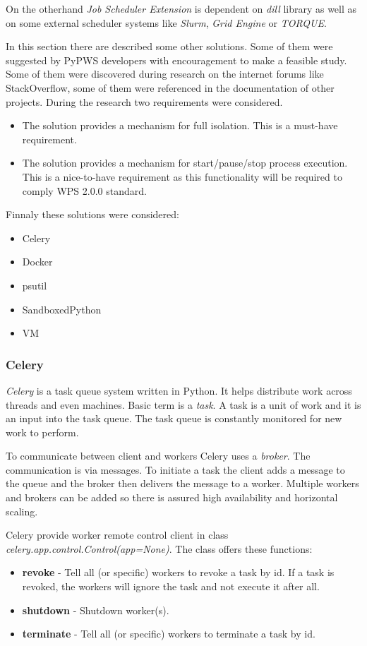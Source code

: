 \documentclass[12pt,a4paper]{article}
\begin{document}
On the otherhand \textit{Job Scheduler Extension} is dependent on \textit{dill} library as well as on some external scheduler
systems like \textit{Slurm}, \textit{Grid Engine} or \textit{TORQUE}.

\bigskip
In this section there are described some other solutions. Some of them were suggested by PyPWS developers with encouragement to
make a feasible study. Some of them were discovered during research on the internet forums like StackOverflow, some of them
were referenced in the documentation of other projects. During the research two requirements were considered.

\begin{itemize}
\item The solution provides a mechanism for full isolation. This is a must-have requirement.
\item The solution provides a mechanism for start/pause/stop process execution. This is a nice-to-have requirement as this functionality
will be required to comply WPS 2.0.0 standard.
\end{itemize}

\noindent
Finnaly these solutions were considered:
\begin{itemize}
\item Celery
\item Docker
\item psutil
\item SandboxedPython
\item VM
\end{itemize}

\subsubsection{Celery}
\textit{Celery} is a task queue system written in Python. It helps distribute work across threads and even machines. Basic term is
a \textit{task}. A task is a unit of work and it is an input into the task queue. The task queue is constantly monitored for new 
work to perform.

To communicate between client and workers Celery uses a \textit{broker}. The communication is via messages. To initiate a task the
client adds a message to the queue and the broker then delivers the message to a worker. Multiple workers and brokers can be added
so there is assured high availability and horizontal scaling.

Celery provide worker remote control client in class \textit{celery.app.control.Control(app=None)}. The class offers these functions:
\begin{itemize}
\item\textbf{revoke} - Tell all (or specific) workers to revoke a task by id. If a task is revoked, the workers will ignore the task and not execute it after all.
\item\textbf{shutdown} - Shutdown worker(s).
\item\textbf{terminate} - Tell all (or specific) workers to terminate a task by id.
\end{itemize}
\end{document}
